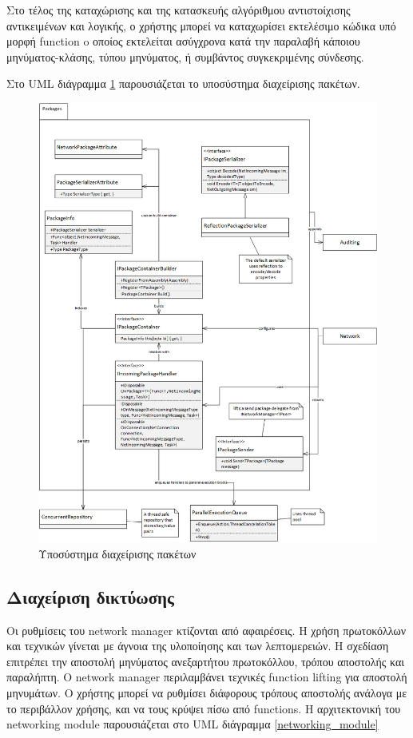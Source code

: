 			Στο τέλος της καταχώρισης και της κατασκευής αλγόριθμου αντιστοίχισης αντικειμένων και λογικής, ο χρήστης μπορεί να καταχωρίσει εκτελέσιμο κώδικα υπό μορφή function o οποίος εκτελείται ασύγχρονα κατά την παραλαβή κάποιου μηνύματος-κλάσης, τύπου μηνύματος, ή συμβάντος συγκεκριμένης σύνδεσης.
			
			Στο \gls{UML} διάγραμμα \ref{network_packages} παρουσιάζεται το υποσύστημα διαχείρισης πακέτων.
			\begin{figure}
				\centering
				\includegraphics[width=165mm]{Images/network_architecture_packages}
				\caption{Υποσύστημα διαχείρισης πακέτων}
				\label{network_packages}
			\end{figure}	
					
			\subsection{Διαχείριση δικτύωσης}	 					
			
			Οι ρυθμίσεις του network manager κτίζονται από αφαιρέσεις. Η χρήση πρωτοκόλλων και τεχνικών γίνεται με άγνοια της υλοποίησης και των λεπτομερειών.
			Η σχεδίαση επιτρέπει την αποστολή μηνύματος ανεξαρτήτου πρωτοκόλλου, τρόπου αποστολής και παραλήπτη. Ο network manager περιλαμβάνει τεχνικές function lifting για αποστολή μηνυμάτων. Ο χρήστης μπορεί να ρυθμίσει διάφορους τρόπους αποστολής ανάλογα με το περιβάλλον χρήσης, και να τους κρύψει πίσω από functions. Η αρχιτεκτονική του networking module παρουσιάζεται στο \gls{UML} διάγραμμα \ref{networking_module}
						

